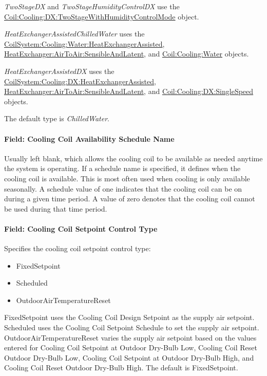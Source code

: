 \emph{TwoStageDX} and \emph{TwoStageHumidityControlDX} use the \hyperref[coilcoolingdxtwostagewithhumiditycontrolmode]{Coil:Cooling:DX:TwoStageWithHumidityControlMode} object.

\emph{HeatExchangerAssistedChilledWater} uses the \hyperref[coilsystemcoolingwaterheatexchangerassisted]{CoilSystem:Cooling:Water:HeatExchangerAssisted}, \hyperref[heatexchangerairtoairsensibleandlatent]{HeatExchanger:AirToAir:SensibleAndLatent}, and \hyperref[coilcoolingwater]{Coil:Cooling:Water} objects.

\emph{HeatExchangerAssistedDX} uses the \hyperref[coilsystemcoolingdxheatexchangerassisted]{CoilSystem:Cooling:DX:HeatExchangerAssisted}, \hyperref[heatexchangerairtoairsensibleandlatent]{HeatExchanger:AirToAir:SensibleAndLatent}, and \hyperref[coilcoolingdxsinglespeed]{Coil:Cooling:DX:SingleSpeed} objects.

The default type is \emph{ChilledWater}.

\paragraph{Field: Cooling Coil Availability Schedule Name}\label{field-cooling-coil-availability-schedule-name-11}

Usually left blank, which allows the cooling coil to be available as needed anytime the system is operating. If a schedule name is specified, it defines when the cooling coil is available. This is most often used when cooling is only available seasonally. A schedule value of one indicates that the cooling coil can be on during a given time period. A value of zero denotes that the cooling coil cannot be used during that time period.

\paragraph{Field: Cooling Coil Setpoint Control Type}\label{field-cooling-coil-setpoint-control-type-2}

Specifies the cooling coil setpoint control type:

\begin{itemize}
\item
  FixedSetpoint
\item
  Scheduled
\item
  OutdoorAirTemperatureReset
\end{itemize}

FixedSetpoint uses the Cooling Coil Design Setpoint as the supply air setpoint. Scheduled uses the Cooling Coil Setpoint Schedule to set the supply air setpoint. OutdoorAirTemperatureReset varies the supply air setpoint based on the values entered for Cooling Coil Setpoint at Outdoor Dry-Bulb Low, Cooling Coil Reset Outdoor Dry-Bulb Low, Cooling Coil Setpoint at Outdoor Dry-Bulb High, and Cooling Coil Reset Outdoor Dry-Bulb High. The default is FixedSetpoint.

